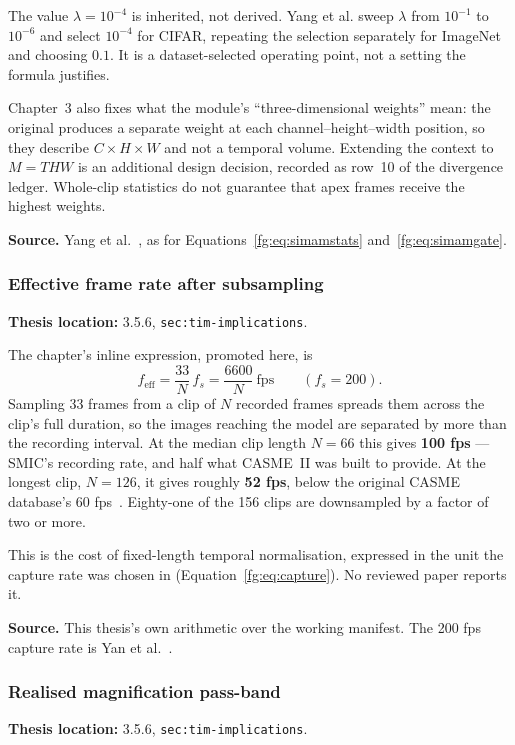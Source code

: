 \documentclass[11pt,a4paper]{article}
\numberwithin{equation}{section}
\begin{document}
The value $\lambda=10^{-4}$ is inherited, not derived. Yang et al. sweep
$\lambda$ from $10^{-1}$ to $10^{-6}$ and select $10^{-4}$ for CIFAR,
repeating the selection separately for ImageNet and choosing $0.1$. It is a
dataset-selected operating point, not a setting the formula justifies.

Chapter~3 also fixes what the module's ``three-dimensional weights'' mean: the
original produces a separate weight at each channel--height--width position,
so they describe $C\times H\times W$ and not a temporal volume. Extending the
context to $M=THW$ is an additional design decision, recorded as row~10 of the
divergence ledger. Whole-clip statistics do not guarantee that apex frames
receive the highest weights.

\textbf{Source.} Yang et al.~\cite{yang2021}, as for
Equations~\eqref{fg:eq:simamstats} and~\eqref{fg:eq:simamgate}.

\subsubsection{Effective frame rate after subsampling}
\label{fg:effective-rate}
\textbf{Thesis location:} 3.5.6, \texttt{sec:tim-implications}.

The chapter's inline expression, promoted here, is
\begin{equation}
    f_{\mathrm{eff}}=\frac{33}{N}\,f_s=\frac{6600}{N}\ \text{fps}
    \qquad (f_s=200).
    \label{fg:eq:effective-rate}
\end{equation}
Sampling 33 frames from a clip of $N$ recorded frames spreads them across the
clip's full duration, so the images reaching the model are separated by more
than the recording interval. At the median clip length $N=66$ this gives
\textbf{100 fps} --- SMIC's recording rate, and half what CASME~II was built to
provide. At the longest clip, $N=126$, it gives roughly \textbf{52 fps}, below
the original CASME database's 60 fps~\cite{yan2014}. Eighty-one of the 156
clips are downsampled by a factor of two or more.

This is the cost of fixed-length temporal normalisation, expressed in the unit
the capture rate was chosen in (Equation~\eqref{fg:eq:capture}). No reviewed
paper reports it.

\textbf{Source.} This thesis's own arithmetic over the working manifest. The
200 fps capture rate is Yan et al.~\cite{yan2014}.

\subsubsection{Realised magnification pass-band}
\label{fg:evm-interval}
\textbf{Thesis location:} 3.5.6, \texttt{sec:tim-implications}.
\end{document}
